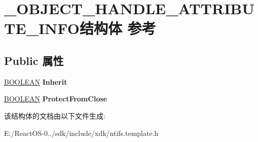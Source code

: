 \hypertarget{struct___o_b_j_e_c_t___h_a_n_d_l_e___a_t_t_r_i_b_u_t_e___i_n_f_o}{}\section{\+\_\+\+O\+B\+J\+E\+C\+T\+\_\+\+H\+A\+N\+D\+L\+E\+\_\+\+A\+T\+T\+R\+I\+B\+U\+T\+E\+\_\+\+I\+N\+F\+O结构体 参考}
\label{struct___o_b_j_e_c_t___h_a_n_d_l_e___a_t_t_r_i_b_u_t_e___i_n_f_o}
\subsection*{Public 属性}
\begin{DoxyCompactItemize}
\item 
\mbox{\label{struct___o_b_j_e_c_t___h_a_n_d_l_e___a_t_t_r_i_b_u_t_e___i_n_f_o_a76ddb80e7f53c3d86d43507469d809c7}} 
\hyperlink{_processor_bind_8h_a112e3146cb38b6ee95e64d85842e380a}{B\+O\+O\+L\+E\+AN} {\bfseries Inherit}
\item 
\mbox{\label{struct___o_b_j_e_c_t___h_a_n_d_l_e___a_t_t_r_i_b_u_t_e___i_n_f_o_a6cdccd4b39d0898039a0b56c6b609169}} 
\hyperlink{_processor_bind_8h_a112e3146cb38b6ee95e64d85842e380a}{B\+O\+O\+L\+E\+AN} {\bfseries Protect\+From\+Close}
\end{DoxyCompactItemize}


该结构体的文档由以下文件生成\+:\begin{DoxyCompactItemize}
\item 
E\+:/\+React\+O\+S-\/0../sdk/include/xdk/ntifs.\+template.\+h\end{DoxyCompactItemize}
